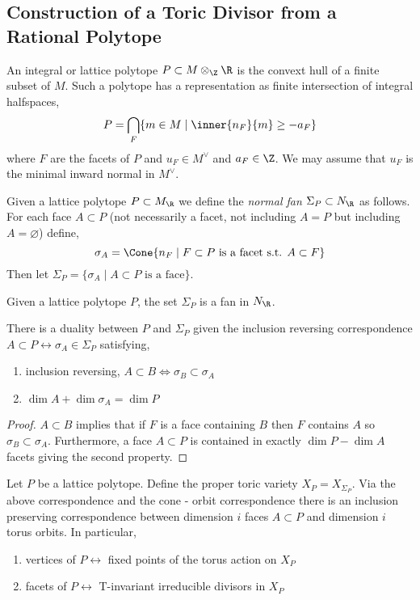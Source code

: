 \documentclass[12pt]{article}
\begin{document}
\subsection{Construction of a Toric Divisor from a Rational Polytope}

\begin{definition}
An integral or lattice polytope $P \subset M \otimes_\Z \R$ is the convext hull of a finite subset of $M$. Such a polytope has a representation as finite intersection of integral halfspaces,
\[ P = \bigcap_F \{ m \in M \mid \inner{n_F}{m} \ge - a_F \} \]
where $F$ are the facets of $P$ and $u_F \in M^\vee$ and $a_F \in \Z$. We may assume that $u_F$ is the minimal inward normal in $M^\vee$.
\end{definition}

\begin{definition}
Given a lattice polytope $P \subset M_\R$ we define the \textit{normal fan} $\Sigma_P \subset N_\R$ as follows. For each face $A \subset P$ (not necessarily a facet, not including $A = P$ but including $A = \varnothing$) define,
\[ \sigma_A = \Cone{ n_F \mid F \subset P \text{ is a facet s.t. } A \subset F } \]
Then let $\Sigma_P = \{ \sigma_A \mid A \subset P \text{ is a face} \}$.
\end{definition}

\begin{proposition}
Given a lattice polytope $P$, the set $\Sigma_P$ is a fan in $N_\R$.
\end{proposition}

\begin{proposition}
There is a duality between $P$ and $\Sigma_P$ given the inclusion reversing correspondence $A \subset P \leftrightarrow \sigma_A \in \Sigma_P$ satisfying,
\begin{enumerate}
\item inclusion reversing, $A \subset B \iff \sigma_B \subset \sigma_A$
\item $\dim{A} + \dim{\sigma_A} = \dim{P}$
\end{enumerate}
\end{proposition}

\begin{proof}
$A \subset B$ implies that if $F$ is a face containing $B$ then $F$ contains $A$ so $\sigma_B \subset \sigma_A$. Furthermore, a face $A \subset P$ is contained in exactly $\dim{P} - \dim{A}$ facets giving the second property. 
\end{proof}

\begin{definition}
Let $P$ be a lattice polytope. Define the proper toric variety $X_P = X_{\Sigma_P}$. Via the above correspondence and the cone - orbit correspondence there is an inclusion preserving correspondence between dimension $i$ faces $A \subset P$ and dimension $i$ torus orbits. In particular,
\begin{enumerate}
\item vertices of $P \leftrightarrow$ fixed points of the torus action on $X_P$
\item facets of $P \leftrightarrow$ T-invariant irreducible divisors in $X_P$
\end{enumerate}
\end{definition}
\end{document}
